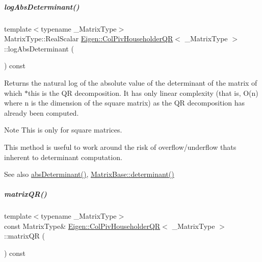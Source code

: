 \mbox{\label{group___q_r___module_a61f28ab7e00c11ae1a95d9a9bca0f963}} 
\subparagraph{\texorpdfstring{log\+Abs\+Determinant()}{logAbsDeterminant()}\hspace{0.1cm}{\footnotesize\ttfamily [2/2]}}
{\footnotesize\ttfamily template$<$typename \+\_\+\+Matrix\+Type$>$ \\
Matrix\+Type\+::\+Real\+Scalar \hyperlink{group___q_r___module_class_eigen_1_1_col_piv_householder_q_r}{Eigen\+::\+Col\+Piv\+Householder\+QR}$<$ \+\_\+\+Matrix\+Type $>$\+::log\+Abs\+Determinant (\begin{DoxyParamCaption}{ }\end{DoxyParamCaption}) const}

\begin{DoxyReturn}{Returns}
the natural log of the absolute value of the determinant of the matrix of which $\ast$this is the QR decomposition. It has only linear complexity (that is, O(n) where n is the dimension of the square matrix) as the QR decomposition has already been computed.
\end{DoxyReturn}
\begin{DoxyNote}{Note}
This is only for square matrices.

This method is useful to work around the risk of overflow/underflow that\textquotesingle{}s inherent to determinant computation.
\end{DoxyNote}
\begin{DoxySeeAlso}{See also}
\hyperlink{group___q_r___module_ac87c3bf42098d6f7324dafbc50fa83f7}{abs\+Determinant()}, \hyperlink{group___core___module_a7ad8f77004bb956b603bb43fd2e3c061}{Matrix\+Base\+::determinant()} 
\end{DoxySeeAlso}
\mbox{\label{group___q_r___module_aa572ac050c8d4fadd4f08a87f6b1e62b}} 
\subparagraph{\texorpdfstring{matrix\+Q\+R()}{matrixQR()}\hspace{0.1cm}{\footnotesize\ttfamily [1/2]}}
{\footnotesize\ttfamily template$<$typename \+\_\+\+Matrix\+Type$>$ \\
const Matrix\+Type\& \hyperlink{group___q_r___module_class_eigen_1_1_col_piv_householder_q_r}{Eigen\+::\+Col\+Piv\+Householder\+QR}$<$ \+\_\+\+Matrix\+Type $>$\+::matrix\+QR (\begin{DoxyParamCaption}{ }\end{DoxyParamCaption}) const\hspace{0.3cm}{\ttfamily [inline]}}

